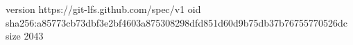 version https://git-lfs.github.com/spec/v1
oid sha256:a85773cb73dbf3e2bf4603a875308298dfd851d60d9b75db37b76755770526dc
size 2043

